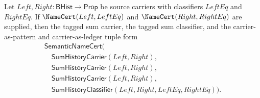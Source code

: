 \begin{theorem}
\label{thm:concrete-sum-namecert}
Let $Left,Right:\mathsf{BHist}\to\mathsf{Prop}$ be source carriers with classifiers
$LeftEq$ and $RightEq$. If $\NameCert(Left,LeftEq)$ and
$\NameCert(Right,RightEq)$ are supplied, then the tagged sum carrier, the tagged
sum classifier, and the carrier-as-pattern and carrier-as-ledger tuple form
$$
\begin{array}{l}
\mathsf{SemanticNameCert}( \\
\quad \mathsf{SumHistoryCarrier}(Left,Right), \\
\quad \mathsf{SumHistoryCarrier}(Left,Right), \\
\quad \mathsf{SumHistoryCarrier}(Left,Right), \\
\quad \mathsf{SumHistoryClassifier}(Left,Right,LeftEq,RightEq)).
\end{array}
$$
\end{theorem}
